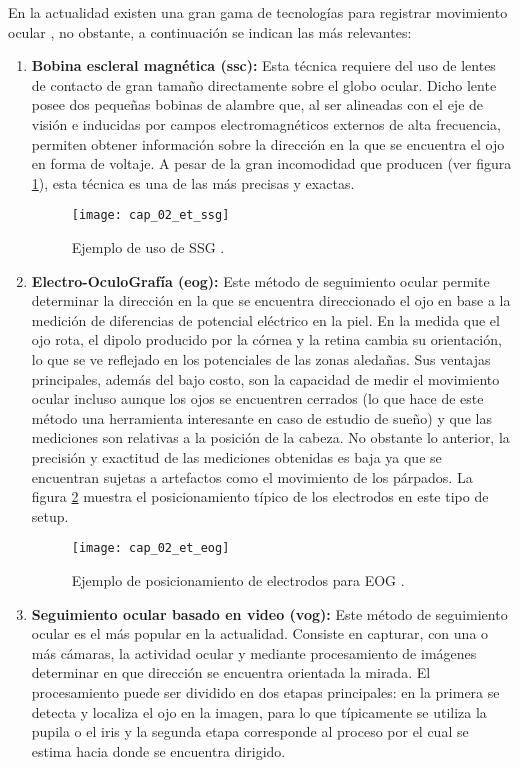 \documentclass[../main.tex]{subfiles}
\begin{document}
				En la actualidad existen una gran gama de tecnologías para registrar movimiento ocular \cite{article:eyetracker_eggert, article:eyetracker_richardson, dissertation:eyetrackers}, no obstante, a continuación se indican las más relevantes: 
				\begin{enumerate}
					\item \textbf{Bobina escleral magnética (\acrshort{ssc}):} Esta técnica requiere del uso de lentes de contacto de gran tamaño directamente sobre el globo ocular. Dicho lente posee dos pequeñas bobinas de alambre que, al ser alineadas con el eje de visión e inducidas por campos electromagnéticos externos de alta frecuencia, permiten obtener información sobre la dirección en la que se encuentra el ojo en forma de voltaje. A pesar de la gran incomodidad que producen (ver figura \ref{fig:02_et_ssc}), esta técnica es una de las más precisas y exactas. 
					\begin{figure}[H]
						\centering
						\texttt{[image: cap\_02\_et\_ssg]}
						\caption{Ejemplo de uso de SSG \cite{website:etSSG}.}
						\label{fig:02_et_ssc}
					\end{figure}

					\item \textbf{Electro-OculoGrafía (\acrshort{eog}):} Este método de seguimiento ocular permite determinar la dirección en la que se encuentra direccionado el ojo en base a la medición de diferencias de potencial eléctrico en la piel. En la medida que el ojo rota, el dipolo producido por la córnea y la retina cambia su orientación, lo que se ve reflejado en los potenciales de las zonas aledañas. Sus ventajas principales, además del bajo costo, son la capacidad de medir el movimiento ocular incluso aunque los ojos se encuentren cerrados (lo que hace de este método una herramienta interesante en caso de estudio de sueño) y que las mediciones son relativas a la posición de la cabeza. No obstante lo anterior, la precisión y exactitud de las mediciones obtenidas es baja ya que se encuentran sujetas a artefactos como el movimiento de los párpados. La figura \ref{fig:02_et_eog} muestra el posicionamiento típico de los electrodos en este tipo de setup. 
					\begin{figure}[H]
						\centering
						\texttt{[image: cap\_02\_et\_eog]}
						\caption{Ejemplo de posicionamiento de electrodos para EOG \cite{website:etEOG}.}
						\label{fig:02_et_eog}
					\end{figure}

					\item \textbf{Seguimiento ocular basado en video (\acrshort{vog}):} Este método de seguimiento ocular es el más popular en la actualidad. Consiste en capturar, con una o más cámaras, la actividad ocular y mediante procesamiento de imágenes determinar en que dirección se encuentra orientada la mirada. El procesamiento puede ser dividido en dos etapas principales: en la primera se detecta y localiza el ojo en la imagen, para lo que típicamente se utiliza la pupila o el iris y la segunda etapa corresponde al proceso por el cual se estima hacia donde se encuentra dirigido. 


\end{enumerate}
\end{document}
